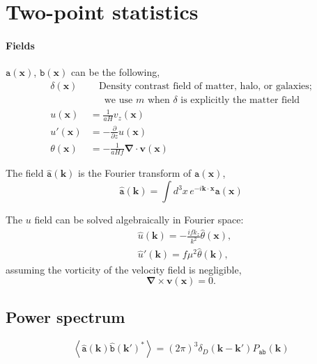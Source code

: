 \documentclass[a4paper,11pt, fleqn]{article}
\begin{document}
%
%
\section{Two-point statistics}

\paragraph{Fields}
$\mathtt{a}(\bm{x})$, $\mathtt{b}(\bm{x})$ can be the following,
%
\begin{align}
  \delta(\bm{x}) &\phantom{=\,} \mbox{Density contrast field of matter, halo, or galaxies;}\\
            &\phantom{=\,} \mbox{we use $m$ when $\delta$ is explicitly the matter field}\\
  u(\bm{x}) &= \frac{1}{aH} v_z(\bm{x})\\
  u'(\bm{x}) &= -\frac{\partial}{\partial z} u(\bm{x})\\
  \theta(\bm{x}) &= - \frac{1}{aHf} \bm{\nabla}\cdot \bm{v}(\bm{x})
\end{align}

\vspace{5mm}
The field $\hat{\texttt{a}}(\bm{k})$ is
the Fourier transform of $\texttt{a}(\bm{x})$, 
\begin{equation}
  \hat{\texttt{a}}(\bm{k}) =
  \int\! d^3 x \, e^{-i\bm{k}\cdot\bm{x}} \texttt{a}(\bm{x})
\end{equation}

The $u$ field can be solved algebraically in Fourier space:
%
\begin{align}
  &\hat{u}(\bm{k}) = -\frac{ifk_z}{k^2} \hat{\theta}(\bm{x}),\\
  &\hat{u}'(\bm{k}) = f\mu^2 \hat{\theta}(\bm{k}),
\end{align}
%
assuming the vorticity of the velocity field is negligible,
%
\begin{equation}
  \bm{\nabla} \times \bm{v}(\bm{x}) = 0.
\end{equation}

\clearpage
\subsection{Power spectrum}
\begin{equation}
  \left\langle \hat{\mathtt{a}}(\bm{k}) \hat{\mathtt{b}}(\bm{k}')^* \right\rangle
  = (2\pi)^3 \delta_D(\bm{k}-\bm{k}') P_{\mathtt{ab}}(\bm{k})
\end{equation}
\end{document}
